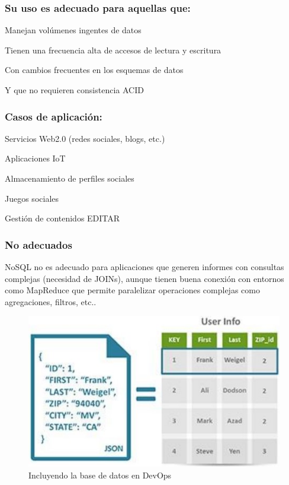 \documentclass[preprint,12pt]{elsarticle}
\begin{document}
\subsubsection{\textbf{Su uso es adecuado para aquellas que:}}
\item Manejan volúmenes ingentes de datos
\item Tienen una frecuencia alta de accesos de lectura y escritura
\item Con cambios frecuentes en los esquemas de datos
\item Y que no requieren consistencia ACID

\subsubsection{\textbf{Casos de aplicación:}}
\item Servicios Web2.0 (redes sociales, blogs, etc.)
\item Aplicaciones IoT
\item Almacenamiento de perfiles sociales
\item Juegos sociales
\item Gestión de contenidos
EDITAR\\
\subsubsection{\textbf{No adecuados}}
NoSQL no es adecuado para aplicaciones que generen informes
con consultas complejas (necesidad de JOINs), aunque tienen
buena conexión con entornos como MapReduce que permite
paralelizar operaciones complejas como agregaciones, filtros,
etc..

\begin{figure}[htb]
	\begin{center}
		\includegraphics[width=14cm]{./IMAGENES/basededatos_1} 
		\caption{Incluyendo la base de datos en DevOps}
	\end{center}
\end{figure}
\end{document}
